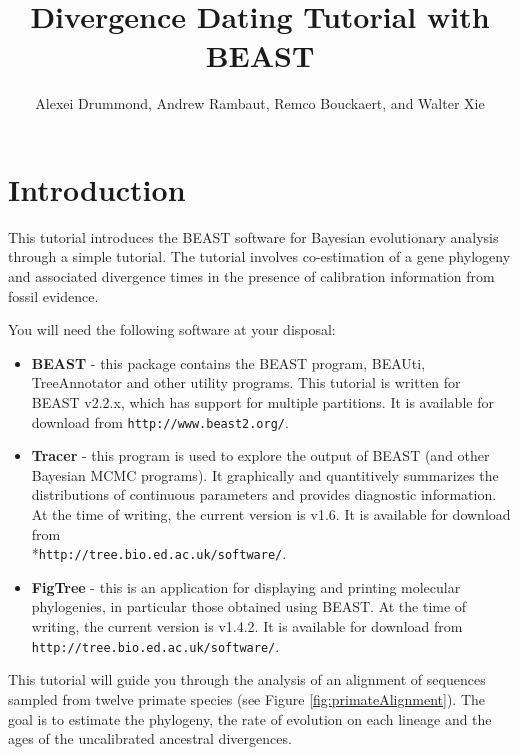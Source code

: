 \documentclass[12pt]{article}
\title{Divergence Dating Tutorial with BEAST {\BEASTVersion}}
\author{Alexei Drummond, Andrew Rambaut, Remco Bouckaert, and Walter Xie}
\newcommand{\BEASTVersion}{2.2.x}
\newcommand{\TracerVersion}{1.6}
\newcommand{\FigTreeVersion}{1.4.2}
\begin{document}
\maketitle

\section{Introduction}

This tutorial introduces the BEAST software for Bayesian evolutionary analysis through a simple tutorial. The tutorial involves co-estimation of a gene phylogeny and associated divergence times in the presence of calibration information from fossil evidence. 

You will need the following software at your disposal:

\begin{itemize}

\item {\bf BEAST} - this package contains the BEAST program, BEAUti, TreeAnnotator and other utility programs. This tutorial is written for BEAST v{\BEASTVersion}, which has support for multiple partitions. It is available for download from \texttt{http://www.beast2.org/}.
\item {\bf Tracer} - this program is used to explore the output of BEAST (and other Bayesian MCMC programs). It graphically and
quantitively summarizes the distributions of continuous parameters and provides diagnostic information. At the time of
writing, the current version is v{\TracerVersion}. It is available for download from\\*\texttt{http://tree.bio.ed.ac.uk/software/}.
\item {\bf FigTree} - this is an application for displaying and printing molecular phylogenies, in particular those obtained using
BEAST. At the time of writing, the current version is v{\FigTreeVersion}. It is available for download from \texttt{http://tree.bio.ed.ac.uk/software/}.
\end{itemize}



This tutorial will guide you through the analysis of an alignment of sequences sampled from twelve primate species (see Figure \ref{fig:primateAlignment}). The goal is to estimate the phylogeny, the rate of evolution on each lineage and the ages of the uncalibrated
ancestral divergences. 
\end{document}
